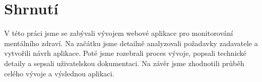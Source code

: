 \section{Shrnutí}\label{sec:shrnuti}

V této práci jsme se zabývali vývojem webové aplikace pro monitorování mentálního zdraví.
Na začátku jsme detailně analyzovali požadavky zadavatele a vytvořili návrh aplikace.
Poté jsme rozebrali proces vývoje, popsali technické detaily a sepsali uživatelskou dokumentaci.
Na závěr jsme zhodnotili průběh celého vývoje a výslednou aplikaci.